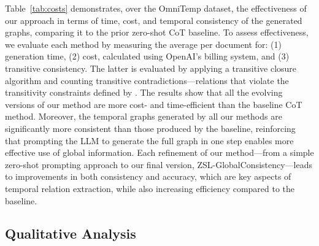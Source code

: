 


 
Table~\ref{tab:costs} demonstrates, over the OmniTemp dataset, the effectiveness of our approach in terms of time, cost, and temporal consistency of the generated graphs, comparing it to the prior zero-shot CoT baseline. 
To assess effectiveness, we evaluate each method by measuring the average per document for: (1) generation time, (2) cost, calculated using OpenAI’s billing system, and (3) transitive consistency. The latter is evaluated by applying a transitive closure algorithm \cite{warsheall-1962} and counting transitive contradictions—relations that violate the transitivity constraints defined by \citet{ning-etal-2018-joint}.
The results show that all the evolving versions of our method are more cost- and time-efficient than the baseline CoT method. Moreover, the temporal graphs generated by all our methods are significantly more consistent than those produced by the baseline, reinforcing that prompting the LLM to generate the full graph in one step enables more effective use of global information.  
Each refinement of our method—from a simple zero-shot prompting approach to our final version, ZSL-GlobalConsistency—leads to improvements in both consistency and accuracy, which are key aspects of temporal relation extraction, while also increasing efficiency compared to the baseline.






\subsection{Qualitative Analysis}
\label{section:results:quality}

